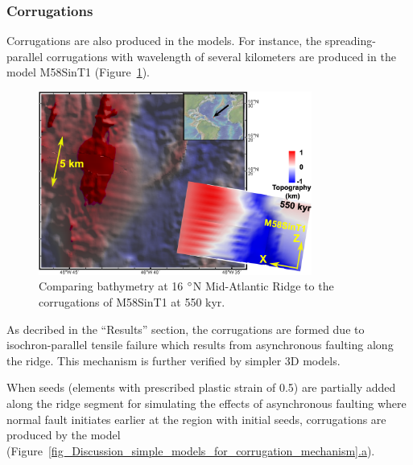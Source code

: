 \subsubsection{Corrugations}

Corrugations are also produced in the models. For instance, the spreading-parallel corrugations with wavelength of several kilometers are produced in the model M58SinT1 (Figure~\hyperref[fig_Discussion_Observation_Corrugations16N_M58SinT1]{\ref{fig_Discussion_Observation_Corrugations16N_M58SinT1}}).

\begin{figure}[h]
  \centering
    \includegraphics[width=0.8\textwidth]{./Figures/TOBE_USED_fig_Discussion_Observation_Corrugations_16N_MAR.eps}
  \caption{Comparing bathymetry at 16 $\degree$N Mid-Atlantic Ridge to the corrugations of M58SinT1 at 550 kyr.}
 \label{fig_Discussion_Observation_Corrugations16N_M58SinT1}
\end{figure}

As decribed in the ``Results'' section, the corrugations are formed due to isochron-parallel tensile failure which results from asynchronous faulting along the ridge. This mechanism is further verified by simpler 3D models.

When seeds (elements with prescribed plastic strain of 0.5) are partially added along the ridge segment for simulating the effects of asynchronous faulting where normal fault initiates earlier at the region with initial seeds, corrugations are produced by the model (Figure~\hyperref[fig_Discussion_simple_models_for_corrugation_mechanism]{\ref{fig_Discussion_simple_models_for_corrugation_mechanism}.a}). 

